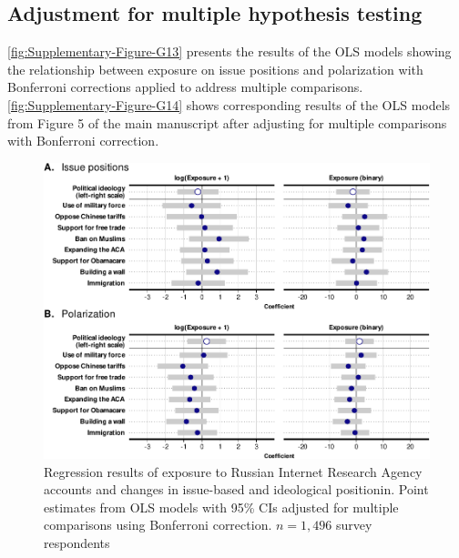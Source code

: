 \documentclass[
  12pt,
]{article}
\begin{document}
\hypertarget{adjustment-for-multiple-hypothesis-testing}{%
\subsection{Adjustment for multiple hypothesis testing}\label{adjustment-for-multiple-hypothesis-testing}}

\autoref{fig:Supplementary-Figure-G13} presents the results of the OLS models showing the relationship between exposure on issue positions and polarization with Bonferroni corrections applied to address multiple comparisons. \autoref{fig:Supplementary-Figure-G14} shows corresponding results of the OLS models from Figure 5 of the main manuscript after adjusting for multiple comparisons with Bonferroni correction.

\begin{figure}
\centering
\includegraphics{Supplementary_Information_files/figure-latex/Supplementary-Figure-G13-1.pdf}
\caption{\label{fig:Supplementary-Figure-G13}Regression results of exposure to Russian Internet Research Agency accounts and changes in issue-based and ideological positionin. Point estimates from OLS models with 95\% CIs adjusted for multiple comparisons using Bonferroni correction. \(n = 1,496\) survey respondents}
\end{figure}
\end{document}
